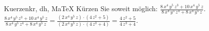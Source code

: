 \begin{MAufgabe}{Kuerzen}{kr, dh, MaTeX}
K\"urzen Sie soweit m\"oglich: $\frac{8\, x^4\, y^5\, z^3 + 10\, x^4\, y^5\, z}{8\, x^4\, y^5\, z^4 + 8\, x^4\, y^5\, z}$.\\ 
\ifLsg\MLoesung
\quad $\frac{8\, x^4\, y^5\, z^3 + 10\, x^4\, y^5\, z}{8\, x^4\, y^5\, z^4 + 8\, x^4\, y^5\, z}=\frac{(2\, x^4\, y^5\, z)\cdot(4\, z^2 + 5)}{(2\, x^4\, y^5\, z)\cdot(4\, z^3 + 4)}=\frac{4\, z^2 + 5}{4\, z^3 + 4}$.\else\relax\fi
 \end{MAufgabe}